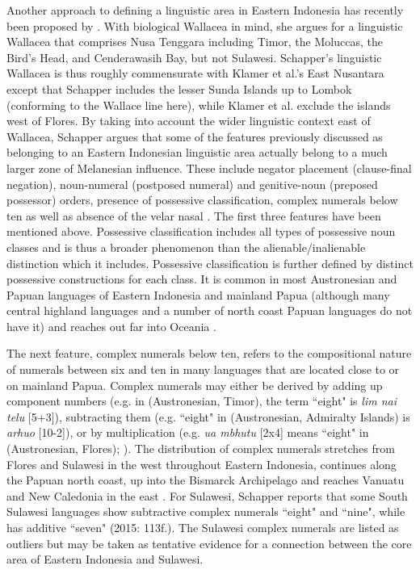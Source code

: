Another approach to defining a linguistic area in Eastern Indonesia has recently been proposed by \citet{schapper2015wallacea}. With biological Wallacea in mind, she argues for a linguistic Wallacea that comprises Nusa Tenggara including Timor, the Moluccas, the
Bird’s Head, and Cenderawasih Bay, but not Sulawesi. Schapper's linguistic Wallacea is thus roughly commensurate with Klamer et al.'s East Nusantara except that Schapper includes the lesser Sunda Islands up to Lombok (conforming to the Wallace line here), while Klamer et al. exclude the islands west of Flores. By taking into account the wider linguistic context east of Wallacea, Schapper argues that some of the features previously discussed as belonging to an Eastern Indonesian linguistic area actually belong to a much larger zone of Melanesian influence. These include negator placement (clause-final negation), noun-numeral (postposed numeral) and genitive-noun (preposed possessor) orders, presence of possessive classification, complex numerals below ten as well as absence of the velar nasal . The first three features have been mentioned above. Possessive classification includes all types of possessive noun classes and is thus a broader phenomenon than the alienable/inalienable distinction which it includes. Possessive classification is further defined by distinct possessive constructions for each class. It is common in most Austronesian and Papuan languages of Eastern Indonesia and mainland Papua (although many central highland languages and a number of north coast Papuan languages do not have it) and reaches out far into Oceania \citep[109]{schapper2015wallacea}.

The next feature, complex numerals below ten, refers to the compositional nature of numerals between six and ten in many languages that are located close to or on mainland Papua. Complex numerals may either be derived by adding up component numbers (e.g. in  (Austronesian, Timor), the term ``eight" is \textit{lim nai telu}
[5+3]), subtracting them (e.g. ``eight" in  (Austronesian, Admiralty Islands) is \textit{arhuo} [10-2]), or by multiplication (e.g. \textit{ua mbhutu} [2x4] means ``eight" in  (Austronesian, Flores); \citealt[113]{schapper2015wallacea}). The distribution of complex numerals stretches from Flores and Sulawesi in the west throughout Eastern Indonesia, continues along the Papuan north coast, up into the Bismarck Archipelago and reaches Vanuatu and New Caledonia in the east \citep[112--4]{schapper2015wallacea}. For Sulawesi, Schapper reports that some South Sulawesi languages show subtractive complex numerals ``eight" and ``nine", while  has additive ``seven" (2015: 113f.). The Sulawesi complex numerals are listed as outliers but may be taken as tentative evidence for a connection between the core area of Eastern Indonesia and Sulawesi.

